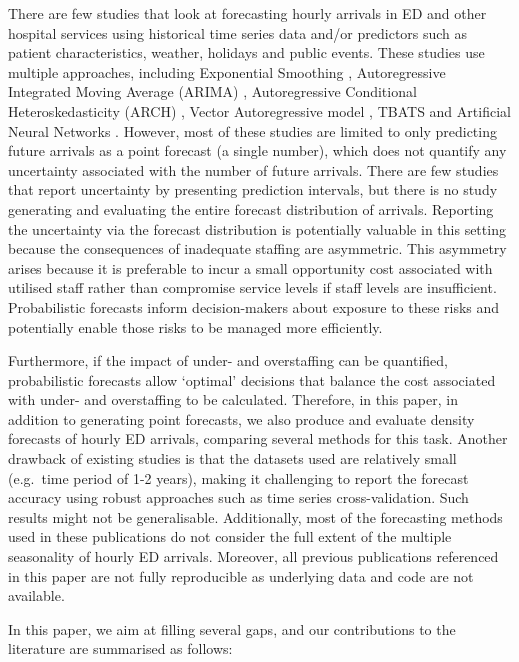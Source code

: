 \documentclass[]{elsarticle} %
\begin{document}
There are few studies that look at forecasting hourly arrivals in ED and other hospital services using historical time series data and/or predictors such as patient characteristics, weather, holidays and public events. These studies use multiple approaches, including Exponential Smoothing \citep{SvetunkovAdam}, Autoregressive Integrated Moving Average (ARIMA) \citep{hyndman2021forecasting}, Autoregressive Conditional Heteroskedasticity (ARCH) \citep{bollerslev1994arch}, Vector Autoregressive model \citep{lutkepohl2013vector}, TBATS \citep{de2011forecasting} and Artificial Neural Networks \citep{hyndman2021forecasting}. However, most of these studies are limited to only predicting future arrivals as a point forecast (a single number), which does not quantify any uncertainty associated with the number of future arrivals. There are few studies that report uncertainty by presenting prediction intervals, but there is no study generating and evaluating the entire forecast distribution of arrivals. Reporting the uncertainty via the forecast distribution is potentially valuable in this setting because the consequences of inadequate staffing are asymmetric. This asymmetry arises because it is preferable to incur a small opportunity cost associated with utilised staff rather than compromise service levels if staff levels are insufficient. Probabilistic forecasts inform decision-makers about exposure to these risks and potentially enable those risks to be managed more efficiently.

Furthermore, if the impact of under- and overstaffing can be quantified, probabilistic forecasts allow `optimal' decisions that balance the cost associated with under- and overstaffing to be calculated. Therefore, in this paper, in addition to generating point forecasts, we also produce and evaluate density forecasts of hourly ED arrivals, comparing several methods for this task. Another drawback of existing studies is that the datasets used are relatively small (e.g.~time period of 1-2 years), making it challenging to report the forecast accuracy using robust approaches such as time series cross-validation. Such results might not be generalisable. Additionally, most of the forecasting methods used in these publications do not consider the full extent of the multiple seasonality of hourly ED arrivals. Moreover, all previous publications referenced in this paper are not fully reproducible as underlying data and code are not available.

In this paper, we aim at filling several gaps, and our contributions to the literature are summarised as follows:
\end{document}
